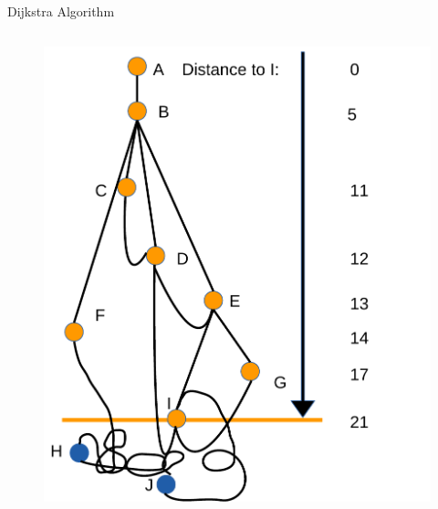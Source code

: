 \begin{frame}{Dijkstra Algorithm}
\begin{columns}
\begin{column}{0.45\linewidth}
\begin{figure}[!t]
        \includegraphics[width=\linewidth]
          {Images/Dijkstra/DijkstraTreeTF.pdf}
      \end{figure}
    \end{column}
  \end{columns}
\end{frame}


